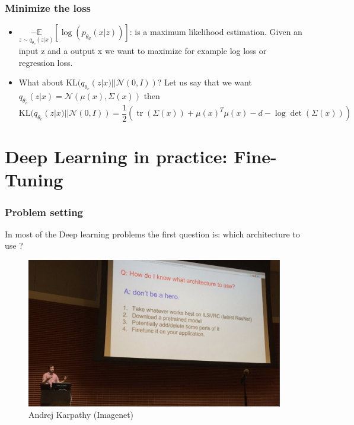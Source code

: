 \documentclass[french,9pt]{beamer}
\begin{document}

\begin{frame}
\frametitle{Minimize the loss}
\begin{itemize}
\item $\underset{z \sim q_{\theta_{e}}(z|x)}{-\mathbb{E}}[\log(p_{\theta_{d}}(x|z))]$: is a maximum likelihood estimation. Given an input z and a output x we want to maximize for example log loss or regression loss.
\item What about $\text{KL}(q_{\theta_{e}}(z|x) || \mathcal{N}(0,I))$? Let us say that we want $q_{\theta_{e}}(z|x)=\mathcal{N}(\mu(x),\Sigma(x))$ then 
$$\text{KL}(q_{\theta_{e}}(z|x) || \mathcal{N}(0,I))=\frac{1}{2}\left(\operatorname{tr}(\Sigma(x))+\mu(x)^{T} \mu(x)-d-\log \operatorname{det}(\Sigma(x))\right)$$
\end{itemize}

\end{frame}


\section{Deep Learning in practice: Fine-Tuning}


\begin{frame}
\frametitle{Problem setting}

In most of the Deep learning problems the first question is: which architecture to use ?

\begin{figure}
  \begin{center}
    \includegraphics[width=1\textwidth]{fig/dont_be_a_hero.png}
    \caption{Andrej Karpathy (Imagenet)}
  \end{center}
\end{figure}


\end{frame}
\end{document}
